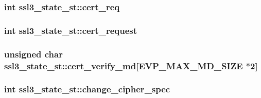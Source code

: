 \subsubsection[{\texorpdfstring{cert\+\_\+req}{cert_req}}]{\setlength{\rightskip}{0pt plus 5cm}int ssl3\+\_\+state\+\_\+st\+::cert\+\_\+req}\hypertarget{structssl3__state__st_a327af794583557335039537168c54e92}{}\label{structssl3__state__st_a327af794583557335039537168c54e92}
\subsubsection[{\texorpdfstring{cert\+\_\+request}{cert_request}}]{\setlength{\rightskip}{0pt plus 5cm}int ssl3\+\_\+state\+\_\+st\+::cert\+\_\+request}\hypertarget{structssl3__state__st_a3385f5f270f16890b56f79175b44f1b1}{}\label{structssl3__state__st_a3385f5f270f16890b56f79175b44f1b1}
\subsubsection[{\texorpdfstring{cert\+\_\+verify\+\_\+md}{cert_verify_md}}]{\setlength{\rightskip}{0pt plus 5cm}unsigned char ssl3\+\_\+state\+\_\+st\+::cert\+\_\+verify\+\_\+md\mbox{[}{\bf E\+V\+P\+\_\+\+M\+A\+X\+\_\+\+M\+D\+\_\+\+S\+I\+ZE} $\ast$2\mbox{]}}\hypertarget{structssl3__state__st_a12aeb740d13d04f5348a87fa80968984}{}\label{structssl3__state__st_a12aeb740d13d04f5348a87fa80968984}
\subsubsection[{\texorpdfstring{change\+\_\+cipher\+\_\+spec}{change_cipher_spec}}]{\setlength{\rightskip}{0pt plus 5cm}int ssl3\+\_\+state\+\_\+st\+::change\+\_\+cipher\+\_\+spec}\hypertarget{structssl3__state__st_ac0fb72191ac2a2269adf2359e8d77382}{}\label{structssl3__state__st_ac0fb72191ac2a2269adf2359e8d77382}
